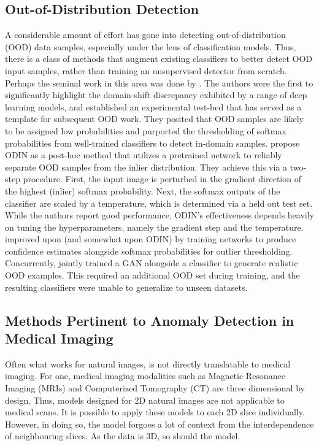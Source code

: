 \subsection{Out-of-Distribution Detection}
A considerable amount of effort has gone into detecting out-of-distribution (OOD) data samples, especially under the lens of classification models. Thus, there is a class of methods that augment existing classifiers to better detect OOD input samples, rather than training an unsupervised detector from scratch. Perhaps the seminal work in this area was done by \citet{Hendrycks2019}. The authors were the first to significantly highlight the domain-shift discrepancy exhibited by a range of deep learning models, and established an experimental test-bed that has served as a template for subsequent OOD work. They posited that OOD samples are likely to be assigned low probabilities and purported the thresholding of softmax probabilities from well-trained classifiers to detect in-domain samples. \cite{Liang2017} propose ODIN as a post-hoc method that utilizes a pretrained network to reliably separate OOD samples from the inlier distribution. They achieve this via a two-step procedure. First, the input image is perturbed in the gradient direction of the highest (inlier) softmax probability. Next, the softmax outputs of the classifier are scaled by a temperature, which is determined via a held out test set. While the authors report good performance, ODIN's effectiveness depends heavily on tuning the hyperparameters, namely the gradient step and the temperature. \cite{devries2018learning} improved upon \cite{Hendrycks2019} (and somewhat upon ODIN) by training networks to produce confidence estimates alongside softmax probabilities for outlier thresholding. Concurrently, \cite{Lee2018} jointly trained a GAN alongside a classifier to generate realistic OOD examples. This required an additional OOD set during training, and the resulting classifiers were unable to generalize to unseen datasets.


\subsection{Methods Pertinent to Anomaly Detection in Medical Imaging}

Often what works for natural images, is not directly translatable to medical imaging. For one, medical imaging modalities such as Magnetic Resonance Imaging (MRIs) and Computerized Tomography (CT) are three dimensional by design. Thus, models designed for 2D natural images are not applicable to medical scans. It is possible to apply these models to each 2D slice individually. 
However, in doing so, the model forgoes a lot of context from the interdependence of neighbouring slices. As the data is 3D, so should the model. 

